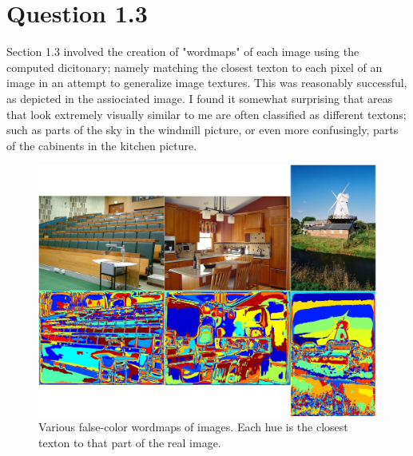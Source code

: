 \documentclass[11pt]{article}
\begin{document}
\section{Question 1.3}
Section 1.3 involved the creation of "wordmaps" of each image using the computed dicitonary;
namely matching the closest texton to each pixel of an image in an attempt to generalize image
textures. This was reasonably successful, as depicted in the assiociated image. I found it somewhat
surprising that areas that look extremely visually similar to me are often classified as different
textons; such as parts of the sky in the windmill picture, or even more confusingly, parts of the 
cabinents in the kitchen picture. 
\begin{figure}[ht]
\centering
\includegraphics[width=\textwidth]{wordmaps.jpg}
\caption{Various false-color wordmaps of images. Each hue is the closest texton to that part of the real image. }
\end{figure}
\end{document}
